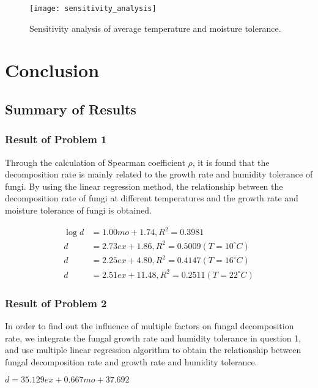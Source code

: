 \documentclass{mcmthesis}
\begin{document}
\begin{figure}[H]
  \small
  \centering
  \texttt{[image: sensitivity\_analysis]}
  \caption{Sensitivity analysis of average temperature and moisture tolerance.}
  \label{sensitivity_analysis}
\end{figure}

\section{Conclusion}

\subsection{Summary of Results}

\subsubsection{Result of Problem 1}

Through the calculation of Spearman coefficient $ \rho $, it is found that the decomposition rate  is mainly related to the growth rate and humidity tolerance of fungi. By using the linear regression method, the relationship between the decomposition rate of fungi at different temperatures and the growth rate and moisture tolerance of fungi is obtained.

\begin{equation}
  \begin{split}
    \log {d}&=1.00mo+1.74,R^2=0.3981 \\
    d&=2.73ex+1.86,R^2=0.5009 (T=10^{\circ}C) \\
    d&=2.25ex+4.80,R^2=0.4147 (T=16^{\circ}C) \\
    d&=2.51ex+11.48,R^2=0.2511 (T=22^{\circ}C)
  \end{split}
\end{equation}

\subsubsection{Result of Problem 2}

In order to find out the influence of multiple factors on fungal decomposition rate, we integrate the fungal growth rate and humidity tolerance in question 1, and use multiple linear regression algorithm to obtain the relationship between fungal decomposition rate and growth rate and humidity tolerance.

$ d = 35.129ex +0.667mo + 37.692 $
\end{document}

